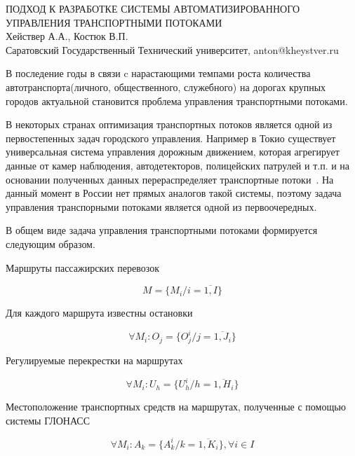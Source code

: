 \documentclass[a4paper,13pt]{article}
\begin{document}
\begin{center} %
    \large ПОДХОД К РАЗРАБОТКЕ СИСТЕМЫ АВТОМАТИЗИРОВАННОГО УПРАВЛЕНИЯ ТРАНСПОРТНЫМИ ПОТОКАМИ\\
    \large Хействер А.А., Костюк В.П.\\
    \large Саратовский Государственный Технический университет, anton@kheystver.ru
\end{center} %
\thispagestyle{empty} %
В последение годы в связи c нарастающими темпами роста количества автотранспорта(личного, общественного, служебного) на дорогах крупных городов актуальной становится проблема управления транспортными потоками. 

В некоторых странах оптимизация транспортных потоков является одной из первостепенных задач городского управления. Например в Токио существует универсальная система управления дорожным движением, которая агрегирует данные от камер наблюдения, автодетекторов, полицейских патрулей и т.п. и на основании полученных данных перераспределяет транспортные потоки~\cite{pa}. На данный момент в России нет прямых аналогов такой системы, поэтому задача управления транспорными потоками является одной из первоочередных.

В общем виде задача управления транспортными потоками формируется следующим образом.

Маршруты пассажирских перевозок

\begin{equation}\label{eq:marshruts}
M = \{ M_i/i= \overline{1,I} \}
\end{equation}

Для каждого маршрута известны остановки

\begin{equation}\label{eq:stops}
\forall M_i :O_j = \{ O^i_{j}/j = \overline{1,J_i} \}
\end{equation}

Регулируемые перекрестки на маршрутах

\begin{equation}\label{eq:crosses}
\forall M_i :U_h = \{ U^i_{h}/h = \overline{1,H_i} \}
\end{equation}

Местоположение транспортных средств на маршрутах, полученные с помощью системы ГЛОНАСС

\begin{equation}\label{eq:objects}
\forall M_i :A_k = \{ A^i_{k}/k = \overline{1,K_i} \}, \forall{i} \in I
\end{equation}
\end{document}
